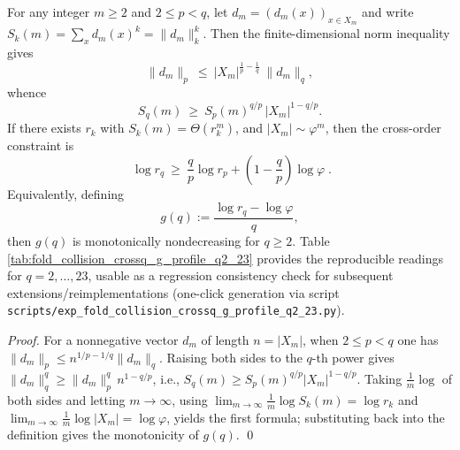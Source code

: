\begin{proposition}\label{prop:pom-crossq-g-monotone}
For any integer \(m\ge 2\) and \(2\le p<q\), let \(d_m=(d_m(x))_{x\in X_m}\) and write \(S_k(m)=\sum_x d_m(x)^k=\|d_m\|_k^k\).
Then the finite-dimensional norm inequality gives
\[
\|d_m\|_p\ \le\ |X_m|^{\frac{1}{p}-\frac{1}{q}}\ \|d_m\|_q,
\]
whence
\[
S_q(m)\ \ge\ S_p(m)^{q/p}\,|X_m|^{1-q/p}.
\]
If there exists \(r_k\) with \(S_k(m)=\Theta(r_k^m)\), and \(|X_m|\sim \varphi^m\), then the cross-order constraint is
\[
\boxed{\;
\log r_q \ \ge\ \frac{q}{p}\log r_p + \left(1-\frac{q}{p}\right)\log\varphi\; }.
\]
Equivalently, defining
\[
g(q):=\frac{\log r_q-\log\varphi}{q},
\]
then \(g(q)\) is monotonically nondecreasing for \(q\ge 2\).
Table \ref{tab:fold_collision_crossq_g_profile_q2_23} provides the reproducible readings for \(q=2,\dots,23\), usable as a regression consistency check for subsequent extensions/reimplementations (one-click generation via script \texttt{scripts/exp\_fold\_collision\_crossq\_g\_profile\_q2\_23.py}).
\end{proposition}
\begin{proof}
For a nonnegative vector \(d_m\) of length \(n=|X_m|\), when \(2\le p<q\) one has \(\|d_m\|_p\le n^{1/p-1/q}\|d_m\|_q\).
Raising both sides to the \(q\)-th power gives
\(
\|d_m\|_q^q \ge \|d_m\|_p^q\,n^{1-q/p}
\),
i.e.,
\(
S_q(m)\ge S_p(m)^{q/p}|X_m|^{1-q/p}
\).
Taking \(\frac{1}{m}\log\) of both sides and letting \(m\to\infty\), using
\(
\lim_{m\to\infty}\frac{1}{m}\log S_k(m)=\log r_k
\)
and
\(
\lim_{m\to\infty}\frac{1}{m}\log|X_m|=\log\varphi
\),
yields the first formula; substituting back into the definition gives the monotonicity of \(g(q)\). \qed
\end{proof}



